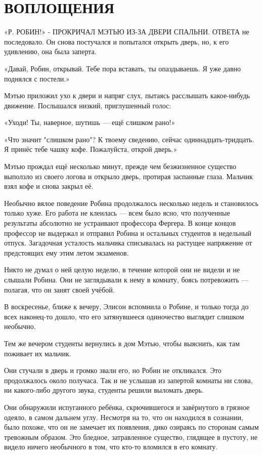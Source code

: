 \documentclass[a4paper,12pt]{book}
\begin{document}
\chapter{ВОПЛОЩЕНИЯ}
\noindent\par«Р{. РОБИН!» - ПРОКРИЧАЛ МЭТЬЮ ИЗ-ЗА ДВЕРИ СПАЛЬНИ. ОТВЕТА} не последовало. Он снова постучался и попытался открыть дверь, но, к его удивлению, она была заперта.
\par
«Давай, Робин, открывай. Тебе пора вставать, ты опаздываешь. Я уже давно поднялся с постели.»
\par
Мэтью приложил ухо к двери и напряг слух, пытаясь расслышать какое-нибудь движение. Послышался низкий, приглушенный голос:
\par
«Уходи! Ты, наверное, шутишь — ещё слишком рано!»
\par
«Что значит "слишком рано"? К твоему сведению, сейчас одиннадцать-тридцать. Я принёс тебе чашку кофе. Пожалуйста, открой дверь.»
\par
Мэтью прождал ещё несколько минут, прежде чем безжизненное существо выползло из своего логова и открыло дверь, протирая заспанные глаза. Мальчик взял кофе и снова закрыл её.\\
\par
Необычно вялое поведение Робина продолжалось несколько недель и становилось только хуже. Его работа не клеилась — всем было ясно, что полученные результаты абсолютно не устраивают профессора Фергера. В конце концов профессор не выдержал и отправил Робина и остальных студентов в недельный отпуск. Загадочная усталость мальчика списывалась на растущее напряжение от предстоящих ему этим летом экзаменов.
\par
Никто не думал о ней целую неделю, в течение которой они не видели и не слышали Робина. Они не заглядывали к нему в комнату, боясь потревожить — полагая, что он занят своей учёбой.
\par
В воскресенье, ближе к вечеру, Элисон вспомнила о Робине, и только тогда до всех наконец-то дошло, что его затянувшееся одиночество выглядит слишком необычно.
\par
Тем же вечером студенты вернулись в дом Мэтью, чтобы выяснить, как там поживает их мальчик.
\par
Они стучали в дверь и громко звали его, но Робин не откликался. Это продолжалось около получаса. Так и не услышав из запертой комнаты ни слова, ни какого-либо другого звука, студенты решили выломать дверь.
\par
Они обнаружили испуганного ребёнка, скрючившегося и завёрнутого в грязное одеяло, в самом дальнем углу. Несмотря на то, что он находился в сознании, было похоже, что он не замечает их появления, дико озираясь по сторонам самым тревожным образом. Это бледное, затравленное существо, глядящее в пустоту, не видело ничего необычного в том, что кто-то вломился в его комнату.
\end{document}
